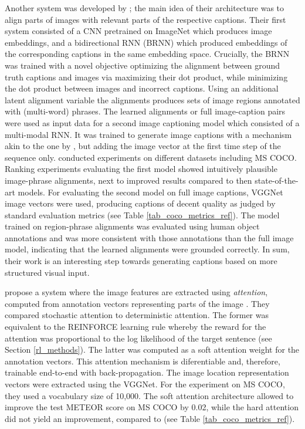 Another system was developed by \cite{karpathy2015deep}; the main idea of their architecture was to align parts of images with relevant parts of the respective captions. 
Their first system consisted of a CNN pretrained on ImageNet which produces image embeddings, and a bidirectional RNN (BRNN) which produced embeddings of the corresponding captions in the same embedding space. Crucially, the BRNN was trained with a novel objective optimizing the alignment between ground truth captions and images via maximizing their dot product, while minimizing the dot product between images and incorrect captions. Using an additional  latent alignment variable the alignments produces sets of image regions annotated with (multi-word) phrases.
The learned alignments or full image-caption pairs were used as input data for a second image captioning model which consisted of a multi-modal RNN. It was trained to generate image captions with a mechanism akin to the one by \cite{vinyals2015show}, but adding the image vector at the first time step of the sequence only. \cite{karpathy2015deep} conducted experiments on different datasets including MS COCO. Ranking experiments evaluating the first model showed intuitively plausible image-phrase alignments, next to improved results compared to then state-of-the-art models. 
For evaluating the second model on full image captions, VGGNet image vectors were used, producing captions of decent quality as judged by standard evaluation metrics (see Table \ref{tab_coco_metrics_ref}). The model trained on region-phrase alignments was evaluated using human object annotations and was more consistent with those annotations than the full image model, indicating that the learned alignments were grounded correctly. In sum, their work is an interesting step towards generating captions based on more structured visual input.

\cite{xu2015show} propose a system where the image features are extracted using \textit{attention}, computed from annotation vectors representing parts of the image \parencite{bahdanau2014neural}. They compared stochastic attention to deterministic attention. The former was equivalent to the REINFORCE learning rule whereby the reward for the attention was proportional to the log likelihood of the target sentence (see Section \ref{rl_methods}). The latter was computed as a soft attention weight for the annotation vectors. This attention mechanism is diferentiable and, therefore, trainable end-to-end with back-propagation. The image location representation vectors were extracted using the VGGNet. For the experiment on MS COCO, they used a vocabulary size of 10,000. The soft attention architecture allowed to improve the test METEOR score on MS COCO by 0.02, while the hard attention did not yield an improvement, compared to \cite{vinyals2015show} (see Table \ref{tab_coco_metrics_ref}).

